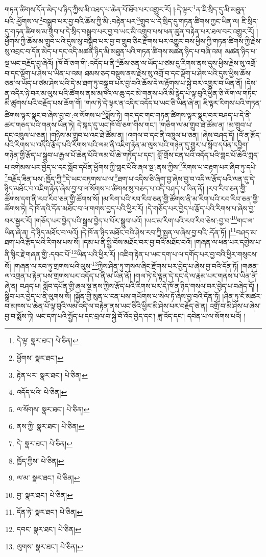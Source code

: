གཏན་ཚིགས་དོན་མེད་པ་ཉིད་ཀྱིས་མི་འཐད་པ་ཆེན་པོ་ཐོབ་པར་འགྱུར་རོ། །:དེ་ལྟར་\footnote{དེ་ལྟ་  སྣར་ཐང་།  པེ་ཅིན། }ན་ཇི་སྲིད་དུ་མི་མཐུན་པའི་:ཕྱོགས་ལ་\footnote{ཕྱོགས་  སྣར་ཐང་། }བསྒྲུབ་པར་བྱ་བའི་ཆོས་ཀྱི་མི་:བརྟེན་པར་\footnote{རྟེན་པར་  སྣར་ཐང་།  པེ་ཅིན། }གྲུབ་པ་དེ་སྲིད་དུ་གཏན་ཚིགས་ཀྱང་ཡིན་ལ། ཇི་སྲིད་དུ་གཏན་ཚིགས་མ་གྲུབ་པ་དེ་སྲིད་བསྒྲུབ་པར་བྱ་བ་ཡང་མི་འགྲུབ་པས་ཕན་ཚུན་བརྟེན་པར་ཐལ་བར་འགྱུར་རོ། །ཕྱོགས་ཀྱི་ཆོས་མ་གྲུབ་པའི་དུས་སུ་བསྒྲུབ་པར་བྱ་བ་གྲུབ་ཅིང་རྫོགས་པར་འགྱུར་བས་ཕྱིས་ཀྱི་གཏན་ཚིགས་ཀྱི་རྗེས་སུ་འབྲང་བ་དོན་མེད་པ་དང་འདི་མཚན་ཉིད་མི་མཐུན་པའི་གཏན་ཚིགས་མཚན་ཉིད་པ་བཞི་འམ། མཚན་ཉིད་པ་ལྔ་ཡང་བརྗོད་བྱ་ཞེའོ། །ཁོ་བོ་ཅག་གི་:འདོད་པ་ནི་\footnote{འདོད་པའི་  པེ་ཅིན། }ཆོས་ཅན་ལ་ཡོད་པ་ཙམ་དུ་རིགས་ནས་དུས་ཕྱིས་རྗེས་སུ་འགྲོ་བ་དང་ལྡོག་པ་ཤེས་པ་ཡིན་པ་འམ། ཐམས་ཅད་བསྡུས་ནས་རྗེས་སུ་འགྲོ་བ་དང་ལྡོག་པ་ཤེས་པའི་དུས་ཕྱིས་ཆོས་ཅན་ལ་ཡོད་པ་ཙམ་ཤེས་པའི་དེ་མ་ཐག་ཏུ་བསྒྲུབ་པར་བྱ་བའི་ཆོས་དེ་ལ་རྟོགས་པ་སྐྱེ་བར་འགྱུར་བ་ཡིན་ནོ། །དེས་ན་འདིར་ཉེ་བར་མ་ལུས་པའི་ཚོགས་ནམ་མཁའ་ལ་ཆུ་དང་མེ་གནས་པའི་མི་རྙེད་པ་ལྟ་བུའི་ཕྱིན་ཅི་ལོག་ལ་གཏིང་མི་ཚུགས་པའི་བརྗོད་པས་ཆོག་གོ། །གལ་ཏེ་དེ་ལྟར་ན་འདིར་འདོད་པ་ཡང་ཅི་ཡིན་ཞེ་ན། ཇི་ལྟར་རིགས་པའི་གཏན་ཚིགས་ལྟར་སྣང་བ་ཞེས་བྱ་བ་:ལ་སོགས་པ་\footnote{ལ་སོགས་  སྣར་ཐང་།  པེ་ཅིན། }སྨོས་ཏེ། གང་དང་གང་གཏན་ཚིགས་ལྟར་སྣང་བར་བཤད་པ་དེ་ནི་ཚར་གཅད་པའི་གནས་ཡིན་ཏེ། དེ་སྐད་དུ་ཡང་ཁོ་བོ་ཅག་གིས་གང་། །གཅིག་ལ་མ་གྲུབ་ཐེ་ཚོམ་ན། །མ་གྲུབ་པ་དང་འཁྲུལ་པ་ཅན། །གཉིས་མ་གྲུབ་པ་འང་ཐེ་ཚོམ་ན། །འགལ་བ་དང་ནི་འཁྲུལ་པ་ཅན། །ཞེས་བཤད་དོ། །འོ་ན་རྩོད་པའི་རིགས་པ་འདིའི་རྩོད་པའི་རིགས་པའི་ལམ་ནི་འཇིག་རྟེན་མ་ལུས་པའི་གཉེན་དུ་གྱུར་པ་སློབ་དཔོན་དབྱིག་གཉེན་གྱི་རྩོད་པ་སྒྲུབ་པ་རྒྱལ་པོ་ཆེན་པོའི་ལམ་པོ་ཆེ་གཏོད་པ་དང་། བློ་གྲོས་ངན་པའི་འདོད་པའི་གླང་པོ་ཆེའི་ཀླད་པ་འགེམས་པར་བྱེད་པ་དང་སློབ་དཔོན་ཕྱོགས་ཀྱི་གླང་པོའི་ཞལ་སྔ་:ནས་ཀྱིས་\footnote{ནས་ཀྱི་  སྣར་ཐང་།  པེ་ཅིན། }རིགས་པ་བརྟག་པར་ཞིབ་ཏུ་དཔེ་\footnote{དེ་  སྣར་ཐང་།  པེ་ཅིན། }བརྗོད་ཟིན་པས་:ཁྱོད་ཀྱི་\footnote{ཁྱོད་ཀྱིས་  པེ་ཅིན། }དེ་ཡང་བཏགས་པ་ལ་\footnote{ལ་མ་  སྣར་ཐང་།  པེ་ཅིན། }ཐག་པ་འདིས་ཅི་ཞིག་བྱ་ཞེས་བྱ་བ་འདི་ལ་རྩོད་པའི་ལན་དུ་དེ་ཉིད་མཐོང་བ་འཇིག་རྟེན་ཞེས་བྱ་བ་ལ་སོགས་པ་ཚིགས་སུ་བཅད་པ་འདི་བཤད་པ་ཡིན་ནོ། །རབ་རིབ་ཅན་གྱི་ཚོགས་དག་ནི་རབ་རིབ་ཅན་གྱི་ཚོགས་སོ། །མ་རིག་པའི་རབ་རིབ་ཅན་གྱི་ཚོགས་ནི་མ་རིག་པའི་རབ་རིབ་ཅན་གྱི་ཚོགས་ཏེ། དེ་ཁོ་ནའི་དོན་མཐོང་བ་ལ་གགས་བྱད་པའི་ཕྱིར་རོ། །དེ་གཅོད་པར་བྱེད་པ་རྩོད་པའི་རིགས་པ་ཞེས་བྱ་བར་སྦྱར་རོ། །གཅོད་པར་བྱེད་པའི་སྒྲས་བྱེད་པ་པོར་སྒྲུབ་པའོ། །ཡང་མ་རིག་པའི་རབ་རིབ་ཅེས་:བྱ་བ་\footnote{བྱ་  སྣར་ཐང་།  པེ་ཅིན། }གང་ལ་ཡིན་ཞེ་ན། དེ་ཉིད་མཐོང་བ་ལའོ། །དེ་ཁོ་ན་ཉིད་མཐོང་བའི་ཤེས་རབ་ཀྱི་སྤྱན་ལ་ཞེས་བྱ་བའི་:དོན་ཏོ། །\footnote{དོན་ཏེ་  སྣར་ཐང་།  པེ་ཅིན། }བཤད་མ་ཐག་པའི་རྩོད་པའི་རིགས་པས་སོ། །དམ་པ་ནི་སྤྱི་བོས་མཐོང་བར་བྱ་བའི་མཐོང་བའོ། །གཞན་ལ་ཕན་པར་དགྱེས་པ་ནི་སྙིང་རྗེ་གཞན་གྱི་:དབང་པོ་\footnote{དབང་  སྣར་ཐང་།  པེ་ཅིན། }ཡིན་པའི་ཕྱིར་རོ། །འཇིག་རྟེན་པ་ཡང་དག་པ་ལ་དགོད་པར་བྱ་བའི་ཕྱིར་གསུངས་སོ། །གཞན་ལ་རབ་ཏུ་གྲགས་པའི་ལུས་\footnote{ལུགས་  སྣར་ཐང་།  པེ་ཅིན། }ཀྱིས་ཤིན་ཏུ་གསལ་ཞིང་རྫོགས་པར་བྱེད་པ་ཞེས་བྱ་བའི་དོན་ཏོ། །གཞན་ལ་འགྲན་པ་རྟེན་པས་གྲགས་པར་འདོད་པ་ནི་མ་ཡིན་ནོ། །གལ་ཏེ་དེ་ལྟན་དེ་དང་དེ་ལ་རྣམ་པར་གནས་པ་ཡིན་ནོ་ཞེ་ན། བཤད་པ། སློབ་དཔོན་གྱི་ཞལ་སྔ་ནས་ཀྱིས་རྩོད་པའི་རིགས་པར་དེ་ཁོ་ན་ཉིད་གསལ་བར་བྱེད་པ་བཞེད་དོ། །སྒྲིབ་པར་བྱེད་པ་ནི་ལུགས་སོ། །སྐྱོན་གྱི་མུན་པ་ངན་པས་གཡོགས་པ་སེལ་ཏོ་ཞེས་བྱ་བའི་དོན་ཏོ། །ཤིན་ཏུ་ངོ་མཚར་བ་མཁས་པ་ཆེན་པོ་ལྟ་བུའི་ལམ་འདི་ལ་བརྟེན་ནས་ཡང་ཅིའི་ཕྱིར་མི་ཤེས་པར་བརྗོད་ཅེ་ན། འགྲོ་བ་མི་ཤེས་པ་ཞེས་བྱ་བ་སྨོས་ཏེ། ཡང་དག་པའི་སྤྱོད་པ་དང་བྲལ་བ་སྐྱེ་བོ་འོད་བྱེད་དང་། ཟླ་འོད་དང་། དབེན་པ་ལ་སོགས་པའོ། །
